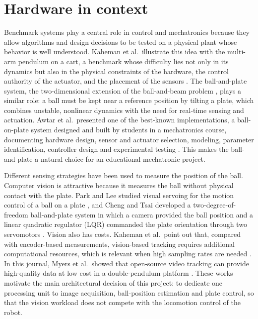 \documentclass[11pt,letterpaper]{article}
\begin{document}
\newpage

\section{Hardware in context}

Benchmark systems play a central role in control and mechatronics
because they allow algorithms and design decisions to be tested on a
physical plant whose behavior is well understood. Kaheman et al.\
illustrate this idea with the multi-arm pendulum on a cart, a benchmark
whose difficulty lies not only in its dynamics but also in the physical
constraints of the hardware, the control authority of the actuator, and
the placement of the sensors \cite{Kaheman2023}. The ball-and-plate
system, the two-dimensional extension of the ball-and-beam problem
\cite{Hauser1992}, plays a similar role: a ball must be kept near a
reference position by tilting a plate, which combines unstable,
nonlinear dynamics with the need for real-time sensing and actuation.
Awtar et al.\ presented one of the best-known implementations, a
ball-on-plate system designed and built by students in a mechatronics
course, documenting hardware design, sensor and actuator selection,
modeling, parameter identification, controller design and experimental
testing \cite{Awtar2002}. This makes the ball-and-plate a natural choice
for an educational mechatronic project.

Different sensing strategies have been used to measure the position of
the ball. Computer vision is attractive because it measures the ball
without physical contact with the plate. Park and Lee studied visual
servoing for the motion control of a ball on a plate \cite{Park2003},
and Cheng and Tsai developed a two-degree-of-freedom ball-and-plate
system in which a camera provided the ball position and a linear
quadratic regulator (LQR) commanded the plate orientation through two
servomotors \cite{ChengTsai2016}. Vision also has costs. Kaheman et al.\
point out that, compared with encoder-based measurements, vision-based
tracking requires additional computational resources, which is relevant
when high sampling rates are needed \cite{Kaheman2023}. In this journal,
Myers et al.\ showed that open-source video tracking can provide
high-quality data at low cost in a double-pendulum platform
\cite{Myers2020}. These works motivate the main architectural decision
of this project: to dedicate one processing unit to image acquisition,
ball-position estimation and plate control, so that the vision workload
does not compete with the locomotion control of the robot.
\end{document}
